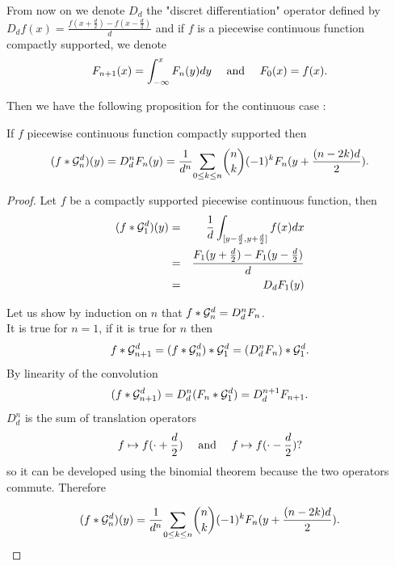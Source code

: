 From now on we denote $D_d$ the "discret differentiation" operator defined by $D_d f(x)=\frac{f(x+\frac{d}{2})-f(x-\frac{d}{2})}{d}$ and if $f$ is a piecewise continuous function compactly supported, we denote \begin{equation*}
F_{n+1}(x)= \int_{-\infty}^{x}F_{n}(y)dy~~~ \textrm{ and }~~~F_{0}(x)= f(x).
\end{equation*}

Then we have the following proposition for the continuous case :

\begin{prop} If $f$ piecewise continuous function compactly supported then
\begin{equation}
 (f*\mathcal{G}_n^d)(y)=D_d^n F_{n}(y)= \frac{1}{d^n}\underset{0 \le k\le n}{\sum} \binom{n}{k}(-1)^{k} F_{n}(y+\frac{(n-2k)d}{2}).
\end{equation}
\label{continuous_approx}
\end{prop}





\begin{proof}
Let $f$ be a compactly supported piecewise continuous function, then
\begin{eqnarray*}
(f * \mathcal{G}_1^d )(y)&=&\frac{1}{d} \int_{[y-\frac{d}{2},y+\frac{d}{2}]} f(x) dx\\
               &=&\frac{F_{1}(y+\frac{d}{2})-F_{1}(y-\frac{d}{2})}{d}\\
               &=&D_d F_{1}(y)
\end{eqnarray*}


\noindent Let us show by induction on $n$ that $ f*\mathcal{G}_n^d=D_d^n F_{n}$.\\
It is true for $n=1$, if it is true for $n$ then
\begin{equation*}
f*\mathcal{G}_{n+1}^{d}=(f * \mathcal{G}_{n}^d) * \mathcal{G}_{1}^{d}= (D_d^n F_{n})*\mathcal{G}_1^d.
\end{equation*}
By linearity of the convolution
\begin{equation*}
(f*\mathcal{G}_{n+1}^{d}) = D_d^n (F_{n}*\mathcal{G}_1^d) = D_d^{n+1} F_{n+1}.
\end{equation*}
$D_d^n$ is the sum of translation operators
\begin{equation*}
f\mapsto f(\cdot+\frac{d}{2})~~~\textrm{ and }~~~f\mapsto f(\cdot-\frac{d}{2})?
\end{equation*}
so it can be developed using the binomial theorem because the two operators commute. Therefore

\begin{equation*}
(f*\mathcal{G}_n^d)(y) = \frac{1}{d^n}\underset{0 \le k\le n}{\sum} \binom{n}{k}(-1)^{k} F_{n}(y+\frac{(n-2k)d}{2}).
\end{equation*}
\end{proof}


